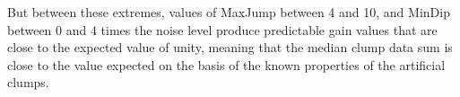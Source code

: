 \documentclass[final,authoryear,5p,times,twocolumn]{elsarticle}
\begin{document}
But between these extremes, values of MaxJump between 4 and 10, and MinDip
between 0 and 4 times the noise level produce predictable gain values that
are close to the expected value of unity, meaning that the median clump data
sum is close to the value expected on the basis of the known properties
of the artificial clumps.

\begin{figure}
\centering
{}
\hspace*{10pt}
\\

\end{figure}
\end{document}

